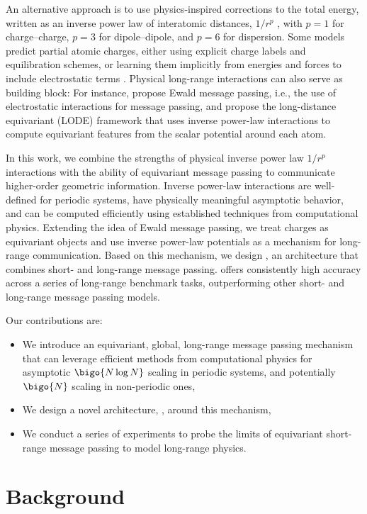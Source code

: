 \documentclass[10pt]{article}
\begin{document}
An alternative approach is to use physics-inspired corrections to the total energy, written as an inverse power law of interatomic distances, $1/r^p$ , with $p=1$ for charge–charge, $p=3$ for dipole–dipole, and $p=6$ for dispersion.
Some models predict partial atomic charges, either using explicit charge labels and equilibration schemes, or learning them implicitly from energies and forces to include electrostatic terms \citep{ucgssm2021,kfgb2021,fzklsnmlbbit2022,plsk2023,mka2025,c2025}.
Physical long-range interactions can also serve as building block: For instance, \cite{kggg2023} propose Ewald message passing, i.e., the use of electrostatic interactions for message passing, and \cite{gc2019} propose the long-distance equivariant (LODE) framework that uses inverse power-law interactions to compute equivariant features from the scalar potential around each atom.

In this work, we combine the strengths of physical inverse power law $1/r^p$ interactions with the ability of equivariant message passing to communicate higher-order geometric information. Inverse power-law interactions are well-defined for periodic systems, have physically meaningful asymptotic behavior, and can be computed efficiently using established techniques from computational physics.
Extending the idea of Ewald message passing, we treat charges as equivariant objects and use inverse power-law potentials as a mechanism for long-range communication.
Based on this mechanism, we design \lorem, an \mlp architecture that combines short- and long-range message passing.
\lorem offers consistently high accuracy across a series of long-range benchmark tasks, outperforming other short- and long-range message passing models.

Our contributions are:
\begin{itemize}
  \item We introduce an equivariant, global, long-range message passing mechanism that can leverage efficient methods from computational physics for asymptotic $\bigo{N \log N}$ scaling in periodic systems, and potentially $\bigo{N}$ scaling in non-periodic ones,
  \item We design a novel \mlp architecture, \lorem, around this mechanism,
  \item We conduct a series of experiments to probe the limits of equivariant short-range message passing to model long-range physics.
\end{itemize}

\section{Background}
\label{sec:background}
\end{document}
